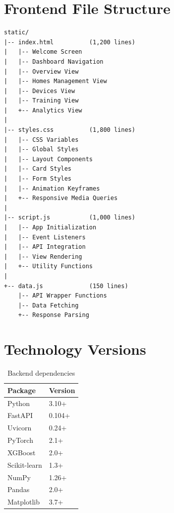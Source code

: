 \documentclass[12pt,a4paper]{article}
\begin{document}
\section{Frontend File Structure}

\begin{lstlisting}[caption=Complete file organization]
static/
|-- index.html          (1,200 lines)
|   |-- Welcome Screen
|   |-- Dashboard Navigation
|   |-- Overview View
|   |-- Homes Management View
|   |-- Devices View
|   |-- Training View
|   +-- Analytics View
|
|-- styles.css          (1,800 lines)
|   |-- CSS Variables
|   |-- Global Styles
|   |-- Layout Components
|   |-- Card Styles
|   |-- Form Styles
|   |-- Animation Keyframes
|   +-- Responsive Media Queries
|
|-- script.js           (1,000 lines)
|   |-- App Initialization
|   |-- Event Listeners
|   |-- API Integration
|   |-- View Rendering
|   +-- Utility Functions
|
+-- data.js             (150 lines)
    |-- API Wrapper Functions
    |-- Data Fetching
    +-- Response Parsing
\end{lstlisting}

\section{Technology Versions}

\begin{table}[H]
\centering
\begin{tabular}{@{}ll@{}}
\toprule
\textbf{Package} & \textbf{Version} \\ \midrule
Python & 3.10+ \\
FastAPI & 0.104+ \\
Uvicorn & 0.24+ \\
PyTorch & 2.1+ \\
XGBoost & 2.0+ \\
Scikit-learn & 1.3+ \\
NumPy & 1.26+ \\
Pandas & 2.0+ \\
Matplotlib & 3.7+ \\ \bottomrule
\end{tabular}
\caption{Backend dependencies}
\end{table}
\end{document}

